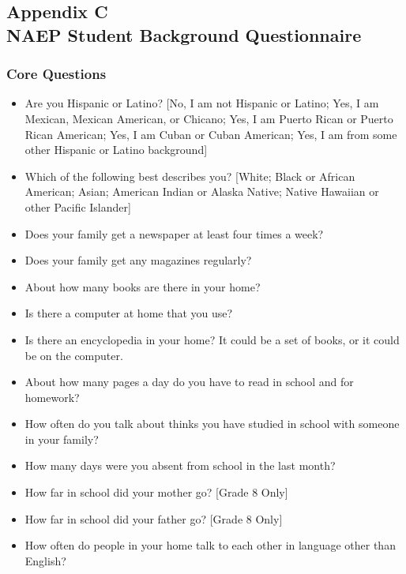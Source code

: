 \documentclass[letterpaper,12pt]{article}
\begin{document}
\subsection*{Appendix C\\NAEP Student Background Questionnaire}
\label{appendixQuestionnaire}
\begin{singlespace}
\subsubsection{Core Questions}
\begin{itemize}
	\item Are you Hispanic or Latino? [No, I am not Hispanic or Latino; Yes, I am Mexican, Mexican American, or Chicano; Yes, I am Puerto Rican or Puerto Rican American; Yes, I am Cuban or Cuban American; Yes, I am from some other Hispanic or Latino background]
	\item Which of the following best describes you? [White; Black or African American; Asian; American Indian or Alaska Native; Native Hawaiian or other Pacific Islander]
	\item Does your family get a newspaper at least four times a week?
	\item Does your family get any magazines regularly?
	\item About how many books are there in your home?
	\item Is there a computer at home that you use?
	\item Is there an encyclopedia in your home? It could be a set of books, or it could be on the computer.
	\item About how many pages a day do you have to read in school and for homework?
	\item How often do you talk about thinks you have studied in school with someone in your family?
	\item How many days were you absent from school in the last month?
	\item How far in school did your mother go? [Grade 8 Only]
	\item How far in school did your father go? [Grade 8 Only]
	\item How often do people in your home talk to each other in language other than English?
\end{itemize}


\end{singlespace}
\end{document}
